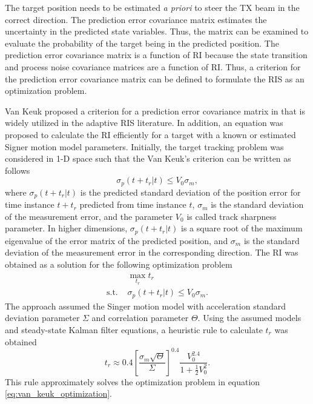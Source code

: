 \documentclass[english, 12pt, a4paper, elec, utf8, a-1b, online]{aaltothesis}
\numberwithin{equation}{section}
\def\prior{\textit{a priori}}
\newcommand{\ri}{t_r}
\begin{document}
\newcommand{\ndwells}{{n_d}}


The target position needs to be estimated \prior{} to steer the TX beam in the correct direction. 
The prediction error covariance matrix estimates the uncertainty in the predicted state variables.
Thus, the matrix can be examined to evaluate the probability of the target being in the predicted position.
The prediction error covariance matrix is a function of RI because the state transition and process noise covariance matrices are a function of RI.
Thus, a criterion for the prediction error covariance matrix can be defined to formulate the RIS as an optimization problem.

Van Keuk proposed a criterion for a prediction error covariance matrix in \cite{Keuk1975} that is widely utilized in the adaptive RIS literature.
In addition, an equation was proposed to calculate the RI efficiently for a target with a known or estimated Signer motion model \cite{RongLi2003} parameters.
Initially, the target tracking problem was considered in 1-D space such that the Van Keuk's criterion can be written as follows
\begin{equation}\label{eq:criterion}
    \sigma_p(t + \ri | t) \leq V_0 \sigma_m,
\end{equation}
where $\sigma_p(t + \ri | t)$ is the predicted standard deviation of the position error for time instance $t+\ri$ predicted from time instance $t$, $\sigma_m$ is the standard deviation of the measurement error, and the parameter $V_0$ is called track sharpness parameter.
In higher dimensions, $\sigma_p(t + \ri | t)$ is a square root of the maximum eigenvalue of the error matrix of the predicted position, and $\sigma_m$ is the standard deviation of the measurement error in the corresponding direction.
The RI was obtained as a solution for the following optimization problem
\begin{equation}\label{eq:van_keuk_optimization}
\begin{array}{ll}
     & \max_{\ri} \ri \\[7pt]
    \text{s.t. } &\sigma_p(t + \ri | t) \leq V_0 \sigma_m. 
\end{array}
\end{equation}
The approach assumed the Singer motion model with acceleration standard deviation parameter $\Sigma$ and correlation parameter $\Theta$.
Using the assumed models and steady-state Kalman filter equations, a heuristic rule to calculate $\ri$ was obtained
\begin{equation}\label{eq:keuk_time}
    \ri \approx 0.4 \left[ \frac{\sigma_m \sqrt{\Theta}}{\Sigma} \right]^{0.4} \frac{V_0^{2.4}}{1+\frac{1}{2}V_0^2}.
\end{equation}
This rule approximately solves the optimization problem in equation \eqref{eq:van_keuk_optimization}.
\end{document}
